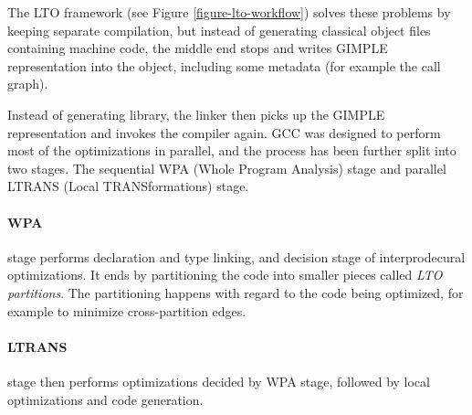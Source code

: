 The LTO framework (see Figure \ref{figure-lto-workflow}) solves these problems by keeping separate compilation, but
instead of generating classical object files containing machine code, the
middle end stops and writes GIMPLE representation into the object, including
some metadata (for example the call graph).

Instead of generating library, the linker then picks up the GIMPLE
representation and invokes the compiler again. GCC was designed to perform most
of the optimizations in parallel, and the process has been further split into
two stages. The sequential WPA (Whole Program Analysis) stage and parallel
LTRANS (Local TRANSformations) stage.

\paragraph{WPA} stage performs declaration and type linking, and decision stage
of interprodecural optimizations. It ends by partitioning the code into smaller
pieces called {\sl LTO partitions}. The partitioning happens with regard to the
code being optimized, for example to minimize cross-partition edges.

\paragraph{LTRANS} stage then performs optimizations decided by WPA stage,
followed by local optimizations and code generation.

